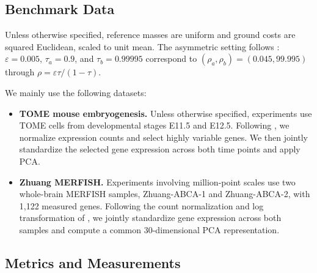 \subsection{Benchmark Data}
\label{app:benchmark-data}

Unless otherwise specified, reference masses are uniform and ground costs are squared Euclidean, scaled to unit mean.
The asymmetric setting follows \citet{klein2025mapping}: $\varepsilon=0.005$, $\tau_a=0.9$, and $\tau_b=0.99995$ correspond to $(\rho_a,\rho_b)=(0.045,99.995)$ through $\rho=\varepsilon\tau/(1-\tau)$.

We mainly use the following datasets:
\begin{itemize}
\item \textbf{TOME mouse embryogenesis.}
Unless otherwise specified, experiments use TOME cells from developmental stages E11.5 and E12.5.
Following \citet{klein2025mapping}, we normalize expression counts and select highly variable genes.
We then jointly standardize the selected gene expression across both time points and apply PCA.

\item \textbf{Zhuang MERFISH.}
Experiments involving million-point scales use two whole-brain MERFISH samples, Zhuang-ABCA-1 and Zhuang-ABCA-2, with 1,122 measured genes.
Following the count normalization and log transformation of \citet{zhang2023wholebrainmerfish}, we jointly standardize gene expression across both samples and compute a common 30-dimensional PCA representation.

\end{itemize}

\subsection{Metrics and Measurements}
\label{app:experiment-metrics}

